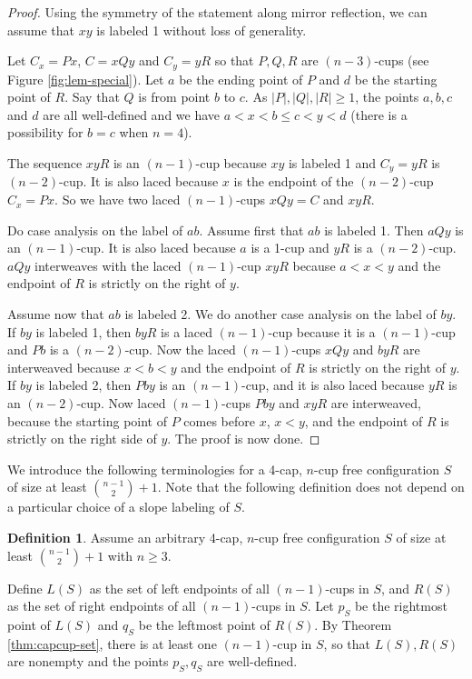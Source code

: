 \documentclass{amsart}
\theoremstyle{definition}
\newtheorem{definition}[thm]{Definition}
\numberwithin{thm}{section}
\begin{document}
\begin{proof}
Using the symmetry of the statement along mirror reflection,
we can assume that $xy$ is labeled 1 without loss of generality.

Let $C_x = Px$, $C = xQy$ and $C_y=yR$ so that $P, Q, R$ are $(n-3)$-cups (see Figure \ref{fig:lem-special}).
Let $a$ be the ending point of $P$ and $d$ be the starting point of $R$.
Say that $Q$ is from point $b$ to $c$. 
As $|P|, |Q|, |R| \geq 1$, the points $a, b, c$ and $d$ are all well-defined and we have $a < x < b \leq c < y < d$ (there is a possibility for $b=c$ when $n = 4$).

The sequence $xyR$ is an $(n-1)$-cup because $xy$ is labeled 1 and $C_y = yR$ is $(n-2)$-cup. 
It is also laced because $x$ is the endpoint of the $(n-2)$-cup $C_x = Px$.
So we have two laced $(n-1)$-cups $xQy = C$ and $xyR$.
 
Do case analysis on the label of $ab$. Assume first that $ab$ is labeled 1. 
Then $aQy$ is an $(n-1)$-cup. It is also laced because $a$ is a 1-cup and $yR$ is a $(n-2)$-cup. 
$aQy$ interweaves with the laced $(n-1)$-cup $xyR$ because $a < x < y$ and the endpoint of $R$ is strictly on the right of $y$.

Assume now that $ab$ is labeled 2. 
We do another case analysis on the label of $by$.
If $by$ is labeled 1, then $byR$ is a laced $(n-1)$-cup because it is a $(n-1)$-cup and $Pb$ is a $(n-2)$-cup.
Now the laced $(n-1)$-cups $xQy$ and $byR$ are interweaved because $x < b < y$ and the endpoint of $R$ is strictly on the right of $y$.
If $by$ is labeled 2, then $Pby$ is an $(n-1)$-cup, and it is also laced because $yR$ is an $(n-2)$-cup.
Now laced $(n-1)$-cups $Pby$ and $xyR$ are interweaved, because the starting point of $P$ comes before $x$, $x < y$, and the endpoint of $R$ is strictly on the right side of $y$.
The proof is now done.
\end{proof}

We introduce the following terminologies for a 4-cap, $n$-cup free configuration $S$ of size at least $\binom{n-1}{2} + 1$.
Note that the following definition does not depend on a particular choice of a slope labeling of $S$.
\begin{definition}
\label{def:endpts}
Assume an arbitrary 4-cap, $n$-cup free configuration $S$ of size at least $\binom{n-1}{2} + 1$ with $n \geq 3$.

Define $L(S)$ as the set of left endpoints of all $(n-1)$-cups in $S$, and $R(S)$ as the set of right endpoints of all $(n-1)$-cups in $S$.
Let $p_S$ be the rightmost point of $L(S)$ and $q_S$ be the leftmost point of $R(S)$.
By Theorem \ref{thm:capcup-set}, there is at least one $(n-1)$-cup in $S$, so that $L(S), R(S)$ are nonempty and the points $p_S, q_S$ are well-defined.
\end{definition}
\end{document}
